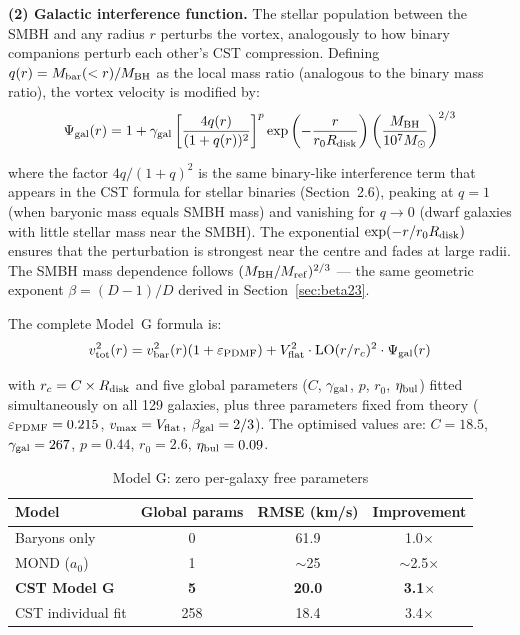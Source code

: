 \documentclass[10pt,a4paper]{article}
\begin{document}
\textbf{(2) Galactic interference function.} The stellar population between the SMBH and any radius $r$ perturbs the vortex, analogously to how binary companions perturb each other's CST compression. Defining $q(r) = M_{\rm bar}(<r)/M_{\rm BH}$ as the local mass ratio (analogous to the binary mass ratio), the vortex velocity is modified by:
\begin{equation}\label{eq:psi_gal}
\Psi_{\rm gal}(r) = 1 + \gamma_{\rm gal} \left[\frac{4q(r)}{(1+q(r))^2}\right]^{p} \exp\left(-\frac{r}{r_0 R_{\rm disk}}\right) \left(\frac{M_{\rm BH}}{10^7 M_\odot}\right)^{2/3}
\end{equation}

where the factor $4q/(1+q)^2$ is the same binary-like interference term that appears in the CST formula for stellar binaries (Section~2.6), peaking at $q = 1$ (when baryonic mass equals SMBH mass) and vanishing for $q \to 0$ (dwarf galaxies with little stellar mass near the SMBH). The exponential $\exp(-r/r_0 R_{\rm disk})$ ensures that the perturbation is strongest near the centre and fades at large radii. The SMBH mass dependence follows $(M_{\rm BH}/M_{\rm ref})^{2/3}$ --- the same geometric exponent $\beta = (D-1)/D$ derived in Section~\ref{sec:beta23}.

The complete Model~G formula is:
\begin{equation}
v_{\rm tot}^2(r) = v_{\rm bar}^2(r)(1 + \varepsilon_{\rm PDMF}) + V_{\rm flat}^2 \cdot {\rm LO}(r/r_c)^2 \cdot \Psi_{\rm gal}(r)
\end{equation}

with $r_c = C \times R_{\rm disk}$ and five global parameters ($C$, $\gamma_{\rm gal}$, $p$, $r_0$, $\eta_{\rm bul}$) fitted simultaneously on all 129 galaxies, plus three parameters fixed from theory ($\varepsilon_{\rm PDMF} = 0.215$, $v_{\rm max} = V_{\rm flat}$, $\beta_{\rm gal} = 2/3$). The optimised values are: $C = 18.5$, $\gamma_{\rm gal} = 267$, $p = 0.44$, $r_0 = 2.6$, $\eta_{\rm bul} = 0.09$.

\begin{table}[h]
\centering
\caption{Model G: zero per-galaxy free parameters}
\begin{tabular}{lccc}
\toprule
Model & Global params & RMSE (km/s) & Improvement \\
\midrule
Baryons only & 0 & 61.9 & 1.0$\times$ \\
MOND ($a_0$) & 1 & $\sim$25 & $\sim$2.5$\times$ \\
\textbf{CST Model G} & \textbf{5} & \textbf{20.0} & \textbf{3.1$\times$} \\
CST individual fit & 258 & 18.4 & 3.4$\times$ \\
\bottomrule
\end{tabular}
\end{table}
\end{document}
